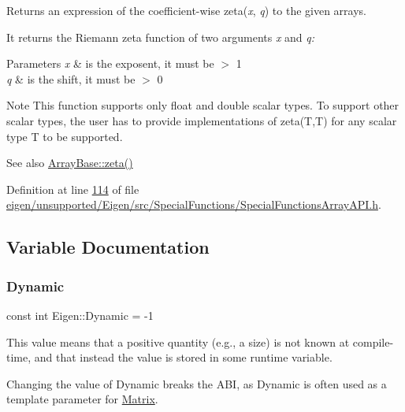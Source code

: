 \begin{DoxyReturn}{Returns}
an expression of the coefficient-\/wise zeta({\itshape x}, {\itshape q}) to the given arrays.
\end{DoxyReturn}
It returns the Riemann zeta function of two arguments {\itshape x} and {\itshape q\+:} 


\begin{DoxyParams}{Parameters}
{\em x} & is the exposent, it must be $>$ 1 \\
\hline
{\em q} & is the shift, it must be $>$ 0\\
\hline
\end{DoxyParams}
\begin{DoxyNote}{Note}
This function supports only float and double scalar types. To support other scalar types, the user has to provide implementations of zeta(\+T,\+T) for any scalar type T to be supported.
\end{DoxyNote}
\begin{DoxySeeAlso}{See also}
\hyperlink{group___core___module_a49091054b94ccc456d8be5fbb4191079}{Array\+Base\+::zeta()} 
\end{DoxySeeAlso}


Definition at line \hyperlink{eigen_2unsupported_2_eigen_2src_2_special_functions_2_special_functions_array_a_p_i_8h_source_l00114}{114} of file \hyperlink{eigen_2unsupported_2_eigen_2src_2_special_functions_2_special_functions_array_a_p_i_8h_source}{eigen/unsupported/\+Eigen/src/\+Special\+Functions/\+Special\+Functions\+Array\+A\+P\+I.\+h}.



\subsection{Variable Documentation}
\mbox{\label{namespace_eigen_ad81fa7195215a0ce30017dfac309f0b2}} 
\subsubsection{\texorpdfstring{Dynamic}{Dynamic}}
{\footnotesize\ttfamily const int Eigen\+::\+Dynamic = -\/1}

This value means that a positive quantity (e.\+g., a size) is not known at compile-\/time, and that instead the value is stored in some runtime variable.

Changing the value of Dynamic breaks the A\+BI, as Dynamic is often used as a template parameter for \hyperlink{group___core___module_class_eigen_1_1_matrix}{Matrix}. 

